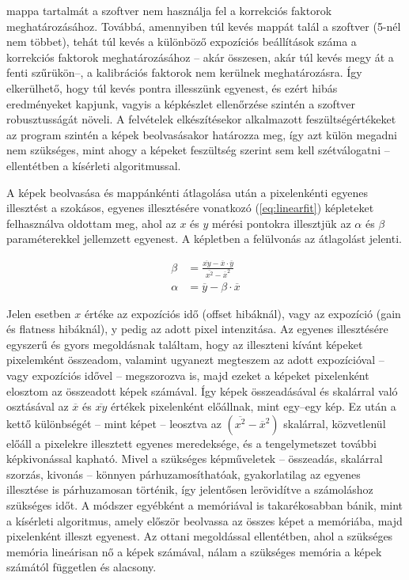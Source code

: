 \documentclass[a4paper,12pt,twoside]{article}
\begin{document}
mappa tartalmát a szoftver nem használja fel a korrekciós faktorok meghatározásához. Továbbá, amennyiben túl kevés mappát talál a szoftver (5-nél nem többet), tehát túl kevés a különböző expozíciós beállítások száma a korrekciós faktorok meghatározásához -- akár összesen, akár túl kevés megy át a fenti szűrükön--, a kalibrációs  faktorok nem kerülnek meghatározásra. Így elkerülhető, hogy túl kevés pontra illesszünk egyenest, és ezért hibás eredményeket kapjunk, vagyis a képkészlet ellenőrzése szintén a szoftver robusztusságát növeli. A felvételek elkészítésekor alkalmazott feszültségértékeket az program szintén a képek beolvasásakor határozza meg, így azt külön megadni nem szükséges, mint ahogy a képeket feszültség szerint sem kell szétválogatni -- ellentétben a kísérleti algoritmussal.

A képek beolvasása és mappánkénti  átlagolása után a pixelenkénti egyenes illesztést a szokásos, egyenes illesztésére vonatkozó (\ref{eq:linearfit}) képleteket felhasználva oldottam meg, ahol az $x$ és $y$ mérési pontokra illesztjük az $\alpha$ és $\beta$ paraméterekkel jellemzett egyenest.  A képletben a felülvonás az átlagolást jelenti.

\begin{equation}
\label{eq:linearfit}
\begin{split}
\beta &= \frac{ \overline{xy} - \overline x \cdot \overline y }{\overline{x^2} - {\overline{x}}^2}\\
\alpha &= \overline y -\beta \cdot \overline x
\end{split}
\end{equation}


Jelen esetben $x$ értéke az expozíciós idő (offset hibáknál), vagy az expozíció (gain és flatness hibáknál), y pedig az adott pixel intenzitása. Az egyenes illesztésére egyszerű és gyors megoldásnak találtam, hogy az illeszteni kívánt képeket pixelemként összeadom, valamint ugyanezt megteszem az adott expozícióval -- vagy expozíciós idővel -- megszorozva is, majd ezeket a képeket pixelenként elosztom az összeadott képek számával. Így képek összeadásával és skalárral való osztásával az $\overline x$ és $\overline{xy}$ értékek pixelenként előállnak, mint egy--egy kép. Ez után a kettő különbségét -- mint képet -- leosztva az  $\left ( \overline{x^2} - {\overline{x}}^2\right )$ skalárral, közvetlenül előáll a pixelekre illesztett egyenes meredeksége, és a tengelymetszet további képkivonással kapható. Mivel a szükséges képműveletek -- összeadás, skalárral szorzás, kivonás -- könnyen párhuzamosíthatóak, gyakorlatilag az egyenes illesztése is párhuzamosan történik, így jelentősen lerövidítve a számoláshoz szükséges időt. 
 A módszer egyébként a memóriával is takarékosabban bánik, mint a kísérleti algoritmus, amely először beolvassa az összes képet a memóriába, majd pixelenként illeszt egyenest. Az ottani megoldással ellentétben, ahol a szükséges memória lineárisan nő a képek számával, nálam a szükséges memória a képek számától független és alacsony.
\end{document}

